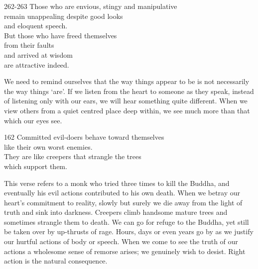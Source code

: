 
\begin{dhpVerse}{262-263}
\label{dhp-262}\label{dhp-263}
Those who are envious, stingy and manipulative\\
remain unappealing despite good looks\\
and eloquent speech.\\
But those who have freed themselves\\
from their faults\\
and arrived at wisdom\\
are attractive indeed.
\end{dhpVerse}

\begin{dhpRefl}

We need to remind ourselves that the way things appear to be is not
necessarily the way things `are'. If we listen from the heart to
someone as they speak, instead of listening only with our ears, we
will hear something quite different. When we view others from a quiet
centred place deep within, we see much more than that which our eyes
see.

\end{dhpRefl}


\begin{dhpVerse}{162}
\label{dhp-162}
Committed evil-doers behave toward themselves\\
like their own worst enemies.\\
They are like creepers that strangle the trees\\
which support them.
\end{dhpVerse}

\begin{dhpRefl}

This verse refers to a monk who tried three times to kill the Buddha,
and eventually his evil actions contributed to his own death. When we
betray our heart's commitment to reality, slowly but surely we die
away from the light of truth and sink into darkness. Creepers climb
handsome mature trees and sometimes strangle them to death. We can
go for refuge to the Buddha, yet still be taken over by up-thrusts of
rage. Hours, days or even years go by as we justify our hurtful
actions of body or speech. When we come to see the truth of our
actions a wholesome sense of remorse arises; we genuinely wish to
desist. Right action is the natural consequence.

\end{dhpRefl}

